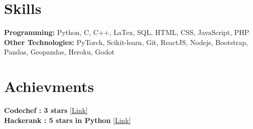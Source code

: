 \documentclass[]{Nikhil_Kadiyan_Resume}
\begin{document}
\section{Skills} 
\hrulefill

\pt \textbf{Programming:} Python, C, C++, LaTex, SQL, HTML, CSS, JavaScript, PHP \\
\pt \textbf{Other Technologies:} PyTorch, Scikit-learn, Git, ReactJS, Nodejs, Bootstrap, Pandas, Geopandas, Heroku, Godot

\sectionsep

\section{Achievments} 
\hrulefill

\pt \textbf{Codechef : 3 stars} \href{https://www.codechef.com/users/nikhilcad}{[Link]} \\
\pt \textbf{Hackerank : 5 stars in Python} \href{https://www.hackerrank.com/nikhilcaddilac?hr_r=1}{[Link]}\\

\sectionsep




\end{document}

